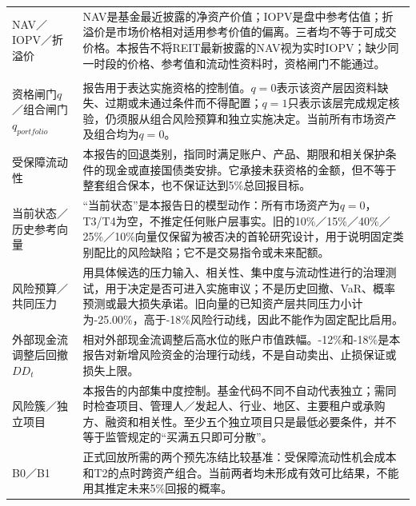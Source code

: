\begin{longtable}{p{2.9cm}p{7.2cm}}
NAV／IOPV／折溢价 & NAV是基金最近披露的净资产价值；IOPV是盘中参考估值；折溢价是市场价格相对适用参考价值的偏离。三者均不等于可成交价格。本报告不将REIT最新披露的NAV视为实时IOPV；缺少同一时段的价格、参考值和流动性资料时，资格闸门不能通过。 \\

\addlinespace[0.25em]
\multicolumn{2}{l}{\textbf{实施与风险控制}} \\
\addlinespace[0.25em]
资格闸门\(q\)／组合闸门\(q_{portfolio}\) & 报告用于表达实施资格的控制值。\(q=0\)表示该资产层因资料缺失、过期或未通过条件而不得配置；\(q=1\)只表示该层完成规定核验，仍须服从组合风险预算和独立实施决定。当前所有市场资产及组合均为\(q=0\)。 \\

受保障流动性 & 本报告的回退类别，指同时满足账户、产品、期限和相关保护条件的现金或直接国债类安排。它承接未获资格的金额，但不等于整套组合保本，也不保证达到5\%总回报目标。 \\

当前状态／历史参考向量 & “当前状态”是本报告日的模型动作：所有市场资产为\(q=0\)，T3/T4为空，不推定任何账户层事实。旧的10\%／15\%／40\%／25\%／10\%向量仅保留为被否决的首轮研究设计，用于说明固定类别配比的风险缺陷；它不是交易指令或未来配额。 \\

风险预算／共同压力 & 用具体候选的压力输入、相关性、集中度与流动性进行的治理测试，用于决定是否可进入实施审议；不是历史回撤、VaR、概率预测或最大损失承诺。旧向量的已知资产层共同压力小计为-25.00\%，高于-18\%风险行动线，因此不能作为固定配比启用。 \\

外部现金流调整后回撤\(DD_t\) & 相对外部现金流调整后高水位的账户市值跌幅。-12\%和-18\%是本报告对新增风险资金的治理行动线，不是自动卖出、止损保证或损失上限。 \\

风险簇／独立项目 & 本报告的内部集中度控制。基金代码不同不自动代表独立；需同时检查项目、管理人／发起人、行业、地区、主要租户或承购方、融资和相关性。至少五个独立项目只是最低必要条件，并不等于监管规定的“买满五只即可分散”。 \\

B0／B1 & 正式回放所需的两个预先冻结比较基准：受保障流动性机会成本和T2的点时跨资产组合。当前两者均未形成有效可比结果，不能用其推定未来5\%回报的概率。 \\
\end{longtable}
\normalsize

